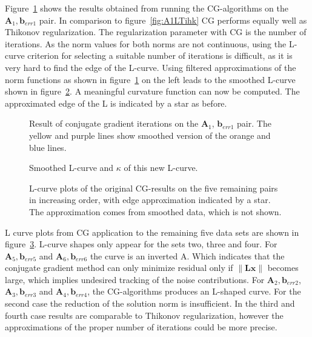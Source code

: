 Figure~\ref{fig:cgA1} shows the results obtained from running the CG-algorithms on the $\mathbf{A}_1, \mathbf{b}_{err1}$ pair. In comparison to figure~\ref{fig:A1LTihk} CG performs equally well as Thikonov regularization. The regularization parameter with CG is the number of iterations. As the norm values for both norms are not continuous, using the L-curve criterion for selecting a suitable number of iterations is difficult, as it is very hard to find the edge of the L-curve. Using filtered approximations of the norm functions as shown in figure~\ref{fig:cgA1} on the left leads to the smoothed L-curve shown in figure~\ref{fig:Lsmooth}. A meaningful curvature function can now be computed. The approximated edge of the L is indicated by a star as before.
\begin{figure}


\caption{Result of conjugate gradient iterations on the $\mathbf{A}_1$, $\mathbf{b}_{err1}$ pair. 
The yellow and purple lines show smoothed version of the orange and blue lines.}
\label{fig:cgA1}
\end{figure}
\begin{figure}


\caption{Smoothed L-curve and $\kappa$ of this new L-curve.}
\label{fig:Lsmooth}
\end{figure}
\begin{figure}
\centering





\caption{L-curve plots of the original CG-results on the five remaining pairs in increasing order, with edge approximation indicated by a star. The approximation comes from smoothed data, which is not shown.}
\label{fig:cgRest}
\end{figure}
L curve plots from CG application to the remaining five data sets are shown in figure~\ref{fig:cgRest}. L-curve shapes only appear for the sets two, three and four. For $\mathbf{A}_5, \mathbf{b}_{err5}$ and $\mathbf{A}_6, \mathbf{b}_{err6}$ the curve is an inverted A. Which indicates that the conjugate gradient method can only minimize residual only if $\|\mathbf{Lx}\|$ becomes large, which implies undesired tracking of the noise contributions.  
For $\mathbf{A}_2, \mathbf{b}_{err2}$, $\mathbf{A}_3, \mathbf{b}_{err3}$ and $\mathbf{A}_4, \mathbf{b}_{err4}$, the CG-algorithms produces an L-shaped curve. 
For the second case the reduction of the solution norm is insufficient. In the third and fourth case results are comparable to Thikonov regularization, however the approximations of the proper number of iterations could be more precise.

